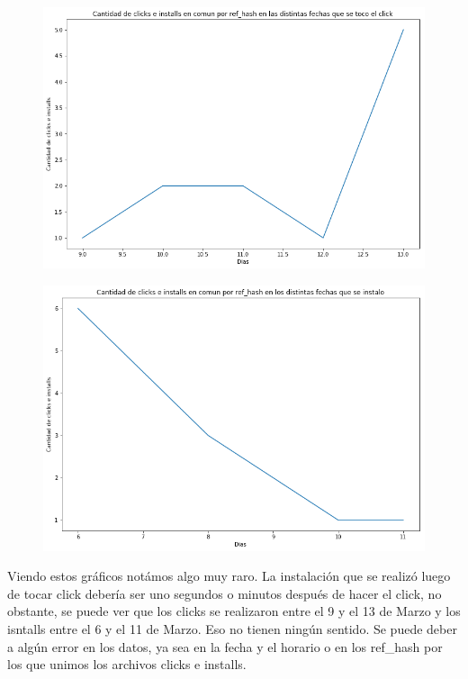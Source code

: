 \documentclass[a4paper, 12pt]{article}
\begin{document}
{{	\FloatBarrier
		\begin{figure}[h]
			\centering
			\includegraphics[width=\textwidth]{images/clicks-installs/days_clicks.png}
			\caption{}
		\end{figure}
	
	
	
		\begin{figure}[h]
			\centering
			\includegraphics[width=\textwidth]{images/clicks-installs/days_installs.png}
			\caption{}
		\end{figure}
	\FloatBarrier

	Viendo estos gráficos notámos algo muy raro. La instalación que se realizó luego de tocar click debería ser uno segundos o minutos después de hacer el click, no obstante, se puede ver que los clicks se realizaron entre el 9 y el 13 de Marzo y los isntalls entre el 6 y el 11 de Marzo. Eso no tienen ningún sentido. Se puede deber a algún error en los datos, ya sea en la fecha y el horario o en los ref\_hash por los que unimos los archivos clicks e installs.
	
}}
\end{document}
